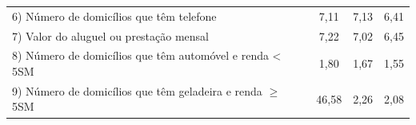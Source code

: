 \documentclass[]{book}
\theoremstyle{definition}
\theoremstyle{definition}
\theoremstyle{definition}
\theoremstyle{remark}
\begin{document}
\begin{longtable}[]{@{}lccc@{}}
\begin{minipage}[t]{0.24\columnwidth}
6) Número de domicílios que têm telefone\strut
\end{minipage} & \begin{minipage}[t]{0.19\columnwidth}\centering\strut
7,11\strut
\end{minipage} & \begin{minipage}[t]{0.20\columnwidth}\centering\strut
7,13\strut
\end{minipage} & \begin{minipage}[t]{0.26\columnwidth}\centering\strut
6,41\strut
\end{minipage}\tabularnewline
\begin{minipage}[t]{0.24\columnwidth}\raggedright\strut
7) Valor do aluguel ou prestação mensal\strut
\end{minipage} & \begin{minipage}[t]{0.19\columnwidth}\centering\strut
7,22\strut
\end{minipage} & \begin{minipage}[t]{0.20\columnwidth}\centering\strut
7,02\strut
\end{minipage} & \begin{minipage}[t]{0.26\columnwidth}\centering\strut
6,45\strut
\end{minipage}\tabularnewline
\begin{minipage}[t]{0.24\columnwidth}\raggedright\strut
8) Número de domicílios que têm automóvel e renda \textless{} 5SM\strut
\end{minipage} & \begin{minipage}[t]{0.19\columnwidth}\centering\strut
1,80\strut
\end{minipage} & \begin{minipage}[t]{0.20\columnwidth}\centering\strut
1,67\strut
\end{minipage} & \begin{minipage}[t]{0.26\columnwidth}\centering\strut
1,55\strut
\end{minipage}\tabularnewline
\begin{minipage}[t]{0.24\columnwidth}\raggedright\strut
9) Número de domicílios que têm geladeira e renda \(\geq\) 5SM\strut
\end{minipage} & \begin{minipage}[t]{0.19\columnwidth}\centering\strut
46,58\strut
\end{minipage} & \begin{minipage}[t]{0.20\columnwidth}\centering\strut
2,26\strut
\end{minipage} & \begin{minipage}[t]{0.26\columnwidth}\centering\strut
2,08\strut
\end{minipage}\tabularnewline
\bottomrule
\end{longtable}
\end{document}
